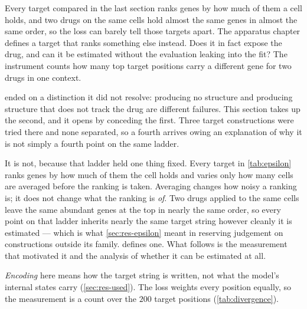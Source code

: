 

\begin{question}[5]
  Every target compared in the last section ranks genes by how much of them a cell
  holds, and two drugs on the same cells hold almost the same genes in almost the
  same order, so the loss can barely tell those targets apart. The apparatus chapter
  defines a target that ranks something else instead. Does it in fact expose the
  drug, and can it be estimated without the evaluation leaking into the fit? The
  instrument counts how many top target positions carry a different gene for two
  drugs in one context. 
  \end{question}

  \noindent
   ended on a distinction it did not resolve: producing no
  structure and producing structure that does not track the drug are different
  failures. This section takes up the second, and it opens by conceding the first.
  Three target constructions were tried there and none separated, so a fourth
  arrives owing an explanation of why it is not simply a fourth point on the same
  ladder.
  
  It is not, because that ladder held one thing fixed. Every target in
  \cref{tab:epsilon} ranks genes by how much of them the cell holds and varies only
  how many cells are averaged before the ranking is taken. Averaging changes how
  noisy a ranking is; it does not change what the ranking is \emph{of}. Two drugs
  applied to the same cells leave the same abundant genes at the top in nearly the
  same order, so every point on that ladder inherits nearly the same target string
  however cleanly it is estimated --- which is what \cref{sec:res-epsilon} meant in
  reserving judgement on constructions outside its family.
   defines one. What follows is the measurement that
  motivated it and the analysis of whether it can be estimated at all.
  
  \emph{Encoding} here means how the target string is written, not what the model's
  internal states carry (\cref{sec:res-used}). The loss weights every position
  equally, so the measurement is a count over the $200$ target positions
  (\cref{tab:divergence}).
  
